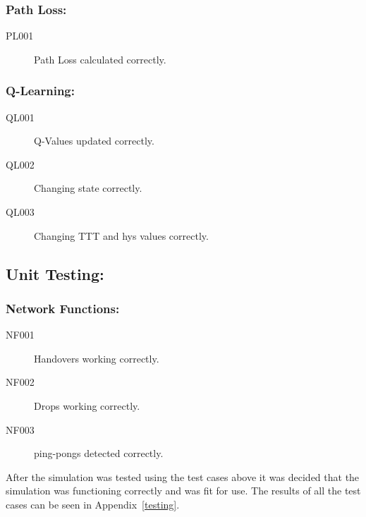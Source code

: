 \subsubsection*{Path Loss:}
\begin{description}
\item[PL001]	Path Loss calculated correctly.
\end{description}
\subsubsection*{Q-Learning:}
\begin{description}
\item[QL001]	Q-Values updated correctly.
\item[QL002]	Changing state correctly.
\item[QL003]	Changing TTT and hys values correctly.
\end{description}
\subsection*{Unit Testing:}
\subsubsection*{Network Functions:}
\begin{description}
\item[NF001]	Handovers working correctly.
\item[NF002]	Drops working correctly.
\item[NF003]	ping-pongs detected correctly.
\end{description}
After the simulation was tested using the test cases above it was decided that the simulation was functioning correctly and was fit for use. The results of all the test cases can be seen in Appendix~\ref{testing}.
